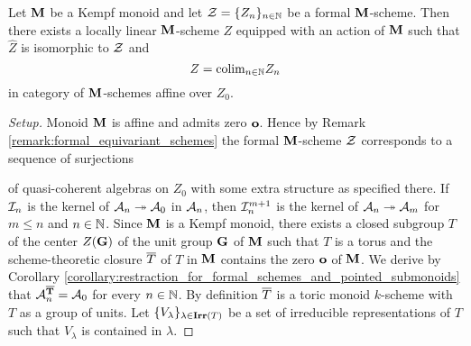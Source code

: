 \begin{theorem}\label{theorem:every_formal_over_kempf_monoid_is_formal_neighborhood}
Let $\mathbf{M}$ be a Kempf monoid and let ${\mathcal Z} = \{Z_n\}_{n\in {\mathbb N}}$ be a formal $\mathbf{M}$-scheme. Then there exists a locally linear $\mathbf{M}$-scheme $Z$ equipped with an action of $\mathbf{M}$ such that $\widehat{Z}$ is isomorphic to ${\mathcal Z}$ and
$$Z = \mathrm{colim}_{n\in {\mathbb N}}Z_n$$
in category of $\mathbf{M}$-schemes affine over $Z_0$.
\end{theorem}
\begin{proof}[Setup]
Monoid $\mathbf{M}$ is affine and admits zero $\mathbf{o}$. Hence by Remark \ref{remark:formal_equivariant_schemes} the formal $\mathbf{M}$-scheme ${\mathcal Z}$ corresponds to a sequence of surjections
\begin{center}
\end{center}
of quasi-coherent algebras on $Z_0$ with some extra structure as specified there. If ${\mathcal I}_n$ is the kernel of ${\mathcal A}_n\twoheadrightarrow {\mathcal A}_0$ in ${\mathcal A}_n$, then ${\mathcal I}_n^{m+1}$ is the kernel of ${\mathcal A}_n\twoheadrightarrow {\mathcal A}_m$ for $m\leq n$ and $n\in {\mathbb N}$. Since $\mathbf{M}$ is a Kempf monoid, there exists a closed subgroup $T$ of the center $Z(\mathbf{G})$ of the unit group $\mathbf{G}$ of $\mathbf{M}$ such that $T$ is a torus and the scheme-theoretic closure $\overline{T}$ of $T$ in $\mathbf{M}$ contains the zero $\mathbf{o}$ of $\mathbf{M}$. We derive by Corollary \ref{corollary:restraction_for_formal_schemes_and_pointed_submonoids} that ${\mathcal A}_n^{\mathbf{\overline{T}}} = {\mathcal A}_0$ for every $n\in {\mathbb N}$. By definition $\overline{T}$ is a toric monoid $k$-scheme with $T$ as a group of units. Let $\{V_{\lambda}\}_{\lambda\in \mathbf{Irr}(T)}$ be a set of irreducible representations of $T$ such that $V_{\lambda}$ is contained in $\lambda$.
\end{proof}

